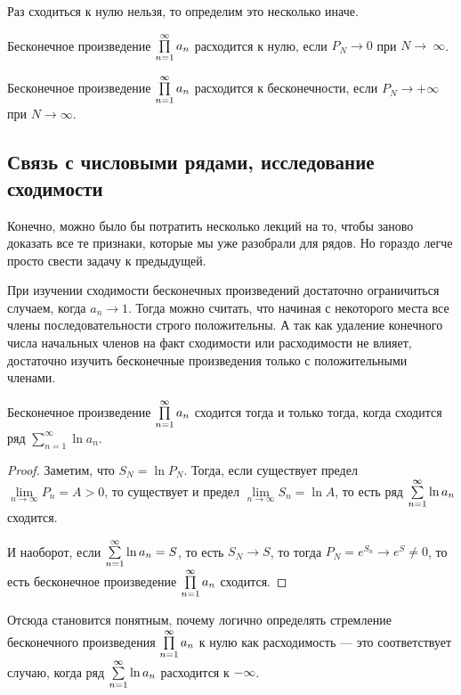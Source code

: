 \documentclass[a4paper, 12pt]{article}
\begin{document}
Раз сходиться к нулю нельзя, то определим это несколько иначе.
\begin{Def}
Бесконечное произведение $\prod\limits_{n=1}^{\infty} a_n$ расходится к нулю, если $P_N \to 0$ при $N \to~\infty$.

Бесконечное произведение $\prod\limits_{n=1}^{\infty} a_n$ расходится к бесконечности, если $P_N \to +\infty$ при $N \to \infty$.
\end{Def}

\subsection{Связь с числовыми рядами, исследование сходимости}

Конечно, можно было бы потратить несколько лекций на то, чтобы заново доказать все те признаки, которые мы уже разобрали для рядов. Но гораздо легче просто свести задачу к предыдущей.

При изучении сходимости бесконечных произведений достаточно ограничиться случаем, когда $a_n \to 1$. Тогда можно считать, что начиная с некоторого места все члены последовательности строго положительны. А так как удаление конечного числа начальных членов на факт сходимости или расходимости не влияет, достаточно изучить бесконечные произведения только с положительными членами.

\begin{Statement}
Бесконечное произведение $\prod\limits_{n=1}^{\infty} a_n$ сходится тогда и только тогда, когда сходится ряд $\sum\limits_{n=1}^{\infty}\ln a_n$.
\end{Statement}
\begin{proof}
Заметим, что $S_N = \ln P_N$. Тогда, если существует предел $\lim\limits_{n \to \infty} P_n = A > 0$, то существует и предел $\lim\limits_{n\to \infty} S_n = \ln A$, то есть ряд $\sum\limits_{n=1}^{\infty}\ln a_n$ сходится.

И наоборот, если $\sum\limits_{n=1}^{\infty}\ln a_n = S$, то есть $S_N \to S$, то тогда $P_N = e^{S_n} \to e^S \neq 0$, то есть бесконечное произведение $\prod\limits_{n=1}^{\infty} a_n$ сходится. 
\end{proof}

Отсюда становится понятным, почему логично определять стремление бесконечного произведения $\prod\limits_{n=1}^{\infty} a_n$ к нулю как расходимость --- это соответствует случаю, когда ряд $\sum\limits_{n=1}^{\infty}\ln a_n$ расходится к $-\infty$.
\end{document}
